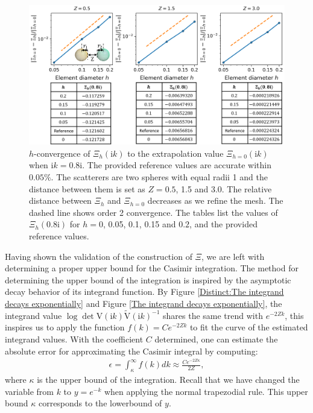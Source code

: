 \begin{figure}[H]
    \centering
    \includegraphics[width = \textwidth]{figures/Scalar_Xi_h_conv.png}
    \caption{$h$-convergence of $\Xi_{h}(\mathrm{i}k)$ to the extrapolation value $\Xi_{h = 0}(\mathrm{i}k)$ when $\mathrm{i}k = 0.8\mathrm{i}$. The provided reference values are accurate within $0.05\%$. The scatterers are two spheres with equal radii 1 and the distance between them is set as $Z = 0.5$, 1.5 and 3.0.
    The relative distance between $\Xi_{h}$ and $\Xi_{h = 0}$ decreases as we refine the mesh. The dashed line shows order 2 convergence. The tables list the values of $\Xi_{h}(0.8\mathrm{i})$ for $h = 0$, 0.05, 0.1, 0.15 and $0.2$, and the provided reference values.}
    \label{Scalar_Xi_h_conv}
\end{figure}

 Having shown the validation of the construction of $\Xi$, we are left with determining a proper upper bound for the Casimir integration. 
 The method for determining the upper bound of the integration is inspired by the asymptotic decay behavior of its integrand function.  
 By Figure \ref{Distinct:The integrand decays exponentially} and Figure \ref{The integrand decays exponentially}, the integrand value $\log\det\mathrm{V}(\mathrm{i}k)\tilde{\mathrm{V}}(\mathrm{i}k)^{-1}$ shares the same trend with $e^{-2Zk}$, this inspires us to apply the function $f(k) = Ce^{-2Zk}$ to fit the curve of the estimated integrand
 values. With the coefficient $C$ determined, one can estimate the absolute error for approximating the Casimir integral by computing:  
 \begin{align} \label{determine ub}
     \epsilon = \int_{\kappa}^{\infty}f(k)dk \approx \frac{Ce^{-2Z\kappa}}{2Z},
 \end{align}
 where $\kappa$ is the upper bound of the integration. Recall that we have changed the variable from $k$ to $y = e^{-k}$ when applying the normal trapezodial rule. This upper bound $\kappa$ corresponds to the lowerbound of $y$.
 

